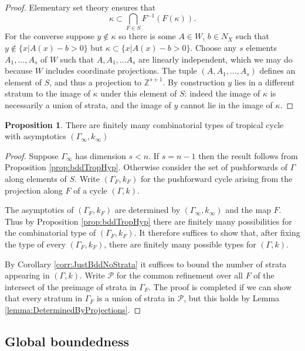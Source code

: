 \documentclass[11pt]{amsart}
\theoremstyle{definition}
\theoremstyle{definition}
\newtheorem{proposition}[theorem]{Proposition}
\begin{document}
\begin{proof}
    Elementary set theory ensures that $${\kappa}\subset \bigcap_{F\in S} F^{-1}(F({\kappa})).$$
    For the converse suppose $y\not\in \kappa$ so there is some $A\in W$, $b \in N_X$ such that $y \not\in \{x|A(x)-b> 0\}$ but ${\kappa}\subset \{x|A(x)-b> 0\}$. Choose any $s$ elements $A_1,...,A_{s}$ of $W$ such that $A,A_1,...A_{s}$ are linearly independent, which we may do because $W$ includes coordinate projections. The tuple $(A,A_1,...,A_{s})$ defines an element of $S$, and thus a projection to $\mathbb{Z}^{s+1}$. By construction $y$ lies in a different stratum to the image of $\kappa$ under this element of $S$: indeed the image of $\kappa$ is necessarily a union of strata, and the image of $y$ cannot lie in the image of $\kappa$. 
\end{proof}

\begin{proposition}\label{prop: TropCyclesBdd}
    There are finitely many combinatorial types of tropical cycle with asymptotics $(\Gamma_\infty, k_\infty)$
\end{proposition}
\begin{proof}
    Suppose $\Gamma_\infty$ has dimension $s<n$. If $s=n-1$ then the result follows from Proposition \ref{prop:bddTropHyp}.
    Otherwise consider the set of pushforwards of $\Gamma$ along elements of $S$. Write $(\Gamma_F,k_F)$ for the pushforward cycle arising from the projection along $F$ of a cycle $(\Gamma,k)$. 
    
    The asymptotics of $(\Gamma_F,k_F)$ are determined by $(\Gamma_\infty, k_\infty)$ and the map $F$. Thus by Proposition \ref{prop:bddTropHyp} there are finitely many possibilities for the combinatorial type of $(\Gamma_F,k_F)$. It therefore suffices to show that, after fixing the type of every $(\Gamma_F,k_F)$, there are finitely many possible types for $(\Gamma,k)$.

    By Corollary \ref{corr:JustBddNoStrata} it suffices to bound the number of strata appearing in $(\Gamma,k)$.  Write $\mathcal{P}$ for the common refinement over all $F$ of the intersect of the preimage of strata in $\Gamma_F$. The proof is completed if we can show that every stratum in $\Gamma_F$ is a union of strata in $\mathcal{P}$, but this holds by Lemma \ref{lemma:DeterminedByProjections}.
\end{proof}
\subsection{Global boundedness}
\end{document}
